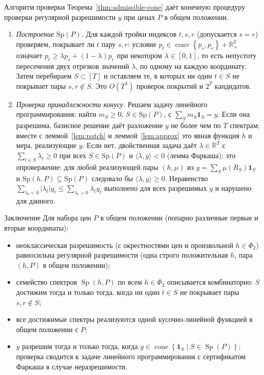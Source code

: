 \documentclass[10pt,aspectratio=169]{beamer}
\theoremstyle{plain}
\theoremstyle{definition}
\newcommand{\R}{\mathbb{R}}
\newcommand{\abs}[1]{\left\lvert #1 \right\rvert}
\newcommand{\set}[1]{\left\{ #1 \right\}}
\newcommand{\ip}[2]{\langle #1, #2\rangle}
\newcommand{\Rp}[1][2]{\R^{#1}_{+}}
\DeclareMathOperator{\cone}{cone}
\DeclareMathOperator{\Sp}{Sp}
\begin{document}
\begin{frame}{Алгоритм проверки}
    Теорема~\ref{thm:admissible-cone} даёт конечную процедуру проверки регулярной разрешимости $y$ при ценах $P$ в общем положении.
    \begin{enumerate}
        \item \emph{Построение $\mathrm{Sp}(P)$.} Для каждой тройки индексов $t,s,r$ (допускается $s=r$) проверяем, покрывает ли $t$ пару $s,r$: условие $p_t\in\operatorname{conv}\set{p_s,p_r}+\Rp$ означает $p_t\ge\lambda p_s+(1-\lambda)p_r$ при некотором $\lambda\in[0,1]$, то есть непустоту пересечения двух отрезков значений $\lambda$, по одному на каждую координату. Затем перебираем $S\subset[T]$ и оставляем те, в которых ни один $t\in S$ не покрывает пары $s,r\notin S$. Это $O(T^3)$ проверок покрытий и $2^T$ кандидатов.
        \item \emph{Проверка принадлежности конусу.} Решаем задачу линейного программирования: найти $m_S\ge0$, $S\in\mathrm{Sp}(P)$, с $\sum_Sm_S\mathbf 1_S=y$. Если она разрешима, базисное решение даёт разложение $y$ не более чем по $T$ спектрам; вместе с леммой~\ref{lem:patch} и леммой~\ref{lem:approx} это явная функция $h$ и мера, реализующие $y$. Если нет, двойственная задача даёт $\lambda\in\R^T$ с $\sum_{t\in S}\lambda_t\ge0$ при всех $S\in\mathrm{Sp}(P)$ и $\ip{\lambda}{y}<0$ (лемма Фаркаша); это опровержение: для любой реализующей пары $(h,\mu)$ из $y=\sum_S\mu(R_S)\mathbf 1_S$ и $\mathrm{Sp}(h,P)\subseteq\mathrm{Sp}(P)$ следовало бы $\ip{\lambda}{y}\ge0$. Неравенство $\sum_{\lambda_t<0}\abs{\lambda_t}y_t\le\sum_{\lambda_t>0}\lambda_ty_t$ выполнено для всех разрешимых $y$ и нарушено для данного.
    \end{enumerate}
\end{frame}

\begin{frame}{Заключение}
    Для набора цен $P$ в общем положении (попарно различные первые и вторые координаты):
    \begin{itemize}
        \item неоклассическая разрешимость (с окрестностями цен и произвольной $h\in\Phi_2$) равносильна регулярной разрешимости (одна строго положительная $h$, пара $(h,P)$ в общем положении);
        \item семейство спектров $\Sp(h,P)$ по всем $h\in\Phi_2$ описывается комбинаторно: $S$ достижим тогда и только тогда, когда ни один $t\in S$ не покрывает пары $s,r\notin S$;
        \item все достижимые спектры реализуются одной кусочно-линейной функцией в общем положении с $P$;
        \item $y$ разрешим тогда и только тогда, когда $y\in\cone\set{\mathbf 1_S\mid S\in\Sp(P)}$; проверка сводится к задаче линейного программирования с сертификатом Фаркаша в случае неразрешимости.
    \end{itemize}
\end{frame}
\end{document}
